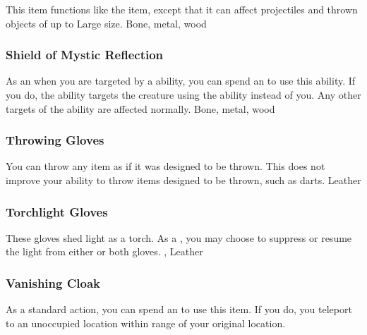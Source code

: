 This item functions like the  item, except that it can affect projectiles and thrown objects of up to Large size.
 
 Bone, metal, wood
\lowercase{\hypertarget{item:Shield of Mystic Reflection}{}}\label{item:Shield of Mystic Reflection}
\hypertarget{item:Shield of Mystic Reflection}{\subsubsection{Shield of Mystic Reflection\hfill{}}}
As an  when you are targeted by a   ability, you can spend an  to use this ability.
If you do, the ability targets the creature using the ability instead of you.
Any other targets of the ability are affected normally.
 
 Bone, metal, wood
\lowercase{\hypertarget{item:Throwing Gloves}{}}\label{item:Throwing Gloves}
\hypertarget{item:Throwing Gloves}{\subsubsection{Throwing Gloves\hfill{}}}
You can throw any item as if it was designed to be thrown.
This does not improve your ability to throw items designed to be thrown, such as darts.
 
 Leather
\lowercase{\hypertarget{item:Torchlight Gloves}{}}\label{item:Torchlight Gloves}
\hypertarget{item:Torchlight Gloves}{\subsubsection{Torchlight Gloves\hfill{}}}
These gloves shed light as a torch.
As a , you may choose to suppress or resume the light from either or both gloves.
 , 
 Leather
\lowercase{\hypertarget{item:Vanishing Cloak}{}}\label{item:Vanishing Cloak}
\hypertarget{item:Vanishing Cloak}{\subsubsection{Vanishing Cloak\hfill{}}}
As a standard action, you can spend an  to use this item.
If you do, you teleport to an unoccupied location within \rngmed range of your original location.
